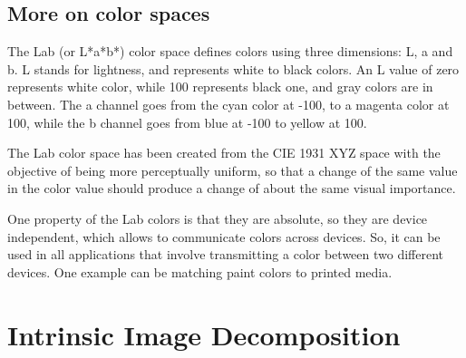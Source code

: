 \documentclass{article}
\begin{document}
    
\subsection{More on color spaces} 

The Lab (or L*a*b*) color space defines colors using three dimensions: L, a and b. L stands for lightness, and represents white to black colors. An L value of zero represents white color, while 100 represents black one, and gray colors are in between. The a channel goes from the cyan color at -100, to a magenta color at 100, while the b channel goes from blue at -100 to yellow at 100. 
	
The Lab color space has been created from the CIE 1931 XYZ space with the objective of being more perceptually uniform, so that a change of the same value in the color value should produce a change of about the same visual importance.

One property of the Lab colors is that they are absolute, so they are device independent, which allows to communicate colors across devices. So, it can be used in all applications that involve transmitting a color between two different devices. One example can be matching paint colors to printed media.

\section{Intrinsic Image Decomposition}
\begin{figure}[h]
    \centering
    \label{fig:intrinsic}
\end{figure}
\end{document}
